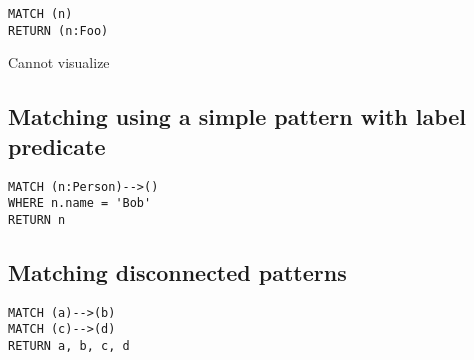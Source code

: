 \begin{lstlisting}
MATCH (n)
RETURN (n:Foo)
\end{lstlisting}

Cannot visualize
\subsection{Matching using a simple pattern with label predicate}

\begin{lstlisting}
MATCH (n:Person)-->()
WHERE n.name = 'Bob'
RETURN n
\end{lstlisting}

\subsection{Matching disconnected patterns}

\begin{lstlisting}
MATCH (a)-->(b)
MATCH (c)-->(d)
RETURN a, b, c, d
\end{lstlisting}


